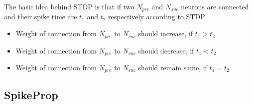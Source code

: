 The basic idea behind STDP is that if two $N_{pre}$ and $N_{suc}$ neurons are
connected and their spike time are $t_1$ and $t_2$ respectively according to
STDP
\begin{itemize}
    \item[]Weight of connection from $N_{pre}$ to $N_{suc}$ should  increase, if $t_1>t_2$

    \item[]Weight of connection from $N_{pre}$ to $N_{suc}$ should  decrease, if $t_1<t_2$
    \item[]Weight of connection from $N_{pre}$ to $N_{suc}$ should  remain same, if $t_1=t_2$
\end{itemize}
\subsection{SpikeProp}






